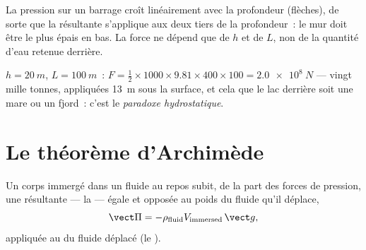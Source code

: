 \begin{omfigure}

{\small La pression sur un barrage croît linéairement avec la profondeur
(flèches), de sorte que la résultante s'applique aux deux tiers de la
profondeur~: le mur doit être le plus épais en bas. La force ne dépend
que de $h$ et de $L$, non de la quantité d'eau retenue derrière.}
\end{omfigure}

\begin{example}[Un barrage]\label{ex:b1:fluid-statics:dam}
$h = \qty{20}{m}$, $L = \qty{100}{m}$~: $F = \tfrac12 \times 1000 \times 9.81 \times
400 \times 100 = \qty{2.0e8}{N}$ --- vingt mille tonnes, appliquées
\qty{13}{m} sous la surface, et cela que le lac derrière soit une mare ou
un fjord~: c'est le \emph{paradoxe hydrostatique}.
\end{example}

\section{Le théorème d'Archimède}

\begin{theorem}[Archimède]\label{thm:b1:fluid-statics:archimedes}
Un corps immergé dans un fluide au repos subit, de la part des forces de
pression, une résultante --- la \emph{} --- égale et
opposée au poids du fluide qu'il déplace,
\[
\vect\Pi = -\rho_{\text{fluid}}V_{\text{immersed}}\,\vect g ,
\]
appliquée au  du fluide déplacé (le \emph{}).
\end{theorem}

